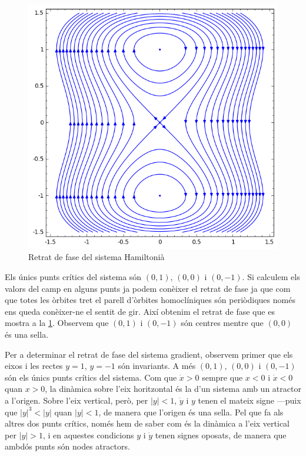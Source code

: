 \documentclass[12pt]{article}
\newcommand{\abs}[1]{\lvert #1 \rvert}
\begin{document}
\begin{enumerate}[label=(\roman*), font=\bfseries \sffamily, wide, labelwidth=!, labelindent=0pt]
		\begin{figure}[htb]
			\centering \sffamily \small
			\includegraphics[scale = 0.7]{retrat-hamiltonia}
			\caption{Retrat de fase del sistema Hamiltonià}
			\label{fig:retrat de fase hamiltonia}
		\end{figure}

		Els únics punts crítics del sistema són \( (0,1) \), \( (0,0) \) i \( (0, -1) \). Si calculem els valors del camp en alguns punts ja podem conèixer el retrat de fase ja que com que totes les òrbites tret el parell d'òrbites homoclíniques són periòdiques només ens queda conèixer-ne el sentit de gir. Així obtenim el retrat de fase que es mostra a la \cref{fig:retrat de fase hamiltonia}. Observem que \( (0,1) \) i \( (0, -1) \) són centres mentre que \( (0,0) \) és una sella. 

		Per a determinar el retrat de fase del sistema gradient, observem primer que els eixos i les rectes \( y = 1 \), \( y = -1 \) són invariants. A més \( (0,1) \), \( (0,0) \) i \( (0, -1) \) són els únics punts crítics del sistema. Com que \( \dot{x} > 0 \) sempre que \( x < 0 \) i \( \dot{x} < 0 \) quan \( x > 0 \), la dinàmica sobre l'eix horitzontal és la d'un sistema amb un atractor a l'origen. Sobre l'eix vertical, però, per \( \abs{y} < 1 \), \( \dot{y} \) i \( y \) tenen el mateix signe ---puix que \( \abs{y}^3 < \abs{y} \) quan \( \abs{y} < 1 \), de manera que l'origen és una sella. Pel que fa als altres dos punts crítics, només hem de saber com és la dinàmica a l'eix vertical per \( \abs{y} > 1 \), i en aquestes condicions \( y \) i \( \dot{y} \) tenen signes oposats, de manera que ambdós punts són nodes atractors. 


\end{enumerate}
\end{document}

